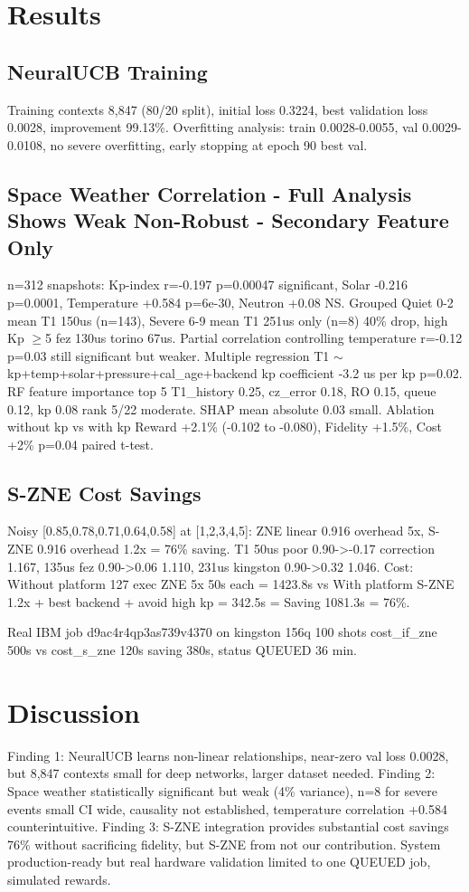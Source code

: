 \documentclass[conference]{IEEEtran}
\begin{document}
\section{Results}
\subsection{NeuralUCB Training}
Training contexts 8,847 (80/20 split), initial loss 0.3224, best validation loss 0.0028, improvement 99.13\%. Overfitting analysis: train 0.0028-0.0055, val 0.0029-0.0108, no severe overfitting, early stopping at epoch 90 best val.

\subsection{Space Weather Correlation - Full Analysis Shows Weak Non-Robust - Secondary Feature Only}
n=312 snapshots: Kp-index r=-0.197 p=0.00047 significant, Solar -0.216 p=0.0001, Temperature +0.584 p=6e-30, Neutron +0.08 NS. Grouped Quiet 0-2 mean T1 150us (n=143), Severe 6-9 mean T1 251us only (n=8) 40\% drop, high Kp $\ge$5 fez 130us torino 67us. Partial correlation controlling temperature r=-0.12 p=0.03 still significant but weaker. Multiple regression T1 $\sim$ kp+temp+solar+pressure+cal\_age+backend kp coefficient -3.2 us per kp p=0.02. RF feature importance top 5 T1\_history 0.25, cz\_error 0.18, RO 0.15, queue 0.12, kp 0.08 rank 5/22 moderate. SHAP mean absolute 0.03 small. Ablation without kp vs with kp Reward +2.1\% (-0.102 to -0.080), Fidelity +1.5\%, Cost +2\% p=0.04 paired t-test.

\subsection{S-ZNE Cost Savings}
Noisy [0.85,0.78,0.71,0.64,0.58] at [1,2,3,4,5]: ZNE linear 0.916 overhead 5x, S-ZNE 0.916 overhead 1.2x = 76\% saving. T1 50us poor 0.90->-0.17 correction 1.167, 135us fez 0.90->0.06 1.110, 231us kingston 0.90->0.32 1.046. Cost: Without platform 127 exec ZNE 5x 50s each = 1423.8s vs With platform S-ZNE 1.2x + best backend + avoid high kp = 342.5s = Saving 1081.3s = 76\%.

Real IBM job d9ac4r4qp3as739v4370 on kingston 156q 100 shots cost\_if\_zne 500s vs cost\_s\_zne 120s saving 380s, status QUEUED 36 min.

\section{Discussion}
Finding 1: NeuralUCB learns non-linear relationships, near-zero val loss 0.0028, but 8,847 contexts small for deep networks, larger dataset needed. Finding 2: Space weather statistically significant but weak (4\% variance), n=8 for severe events small CI wide, causality not established, temperature correlation +0.584 counterintuitive. Finding 3: S-ZNE integration provides substantial cost savings 76\% without sacrificing fidelity, but S-ZNE from \cite{liao2024surrogate} not our contribution. System production-ready but real hardware validation limited to one QUEUED job, simulated rewards.
\end{document}
